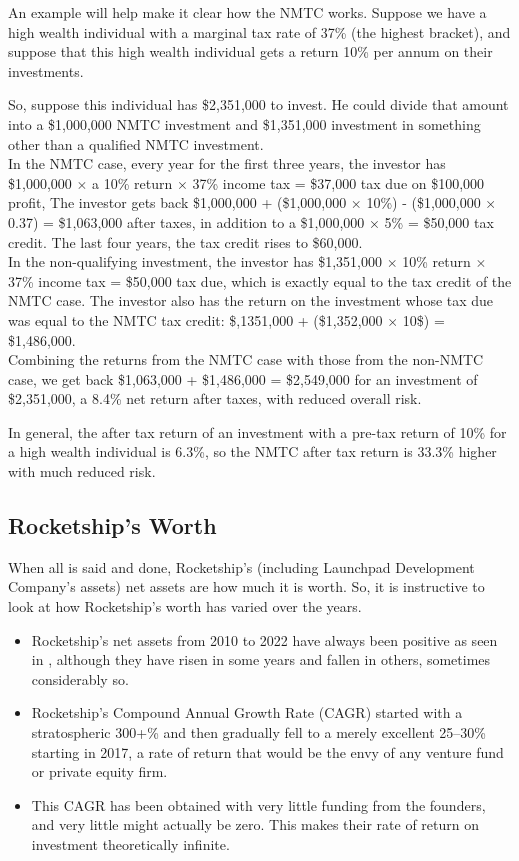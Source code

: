 An example will help make it clear how the NMTC works. Suppose we have a high wealth individual with a marginal tax rate of 37\% (the highest bracket), and suppose that this high wealth individual gets a return 10\% per annum on their investments.

So, suppose this individual has \$2,351,000 to invest. He could divide that amount into a \$1,000,000 NMTC investment and \$1,351,000 investment in something other than a qualified NMTC investment. \\

In the NMTC case, every year for the first three years, the investor has \$1,000,000 $\times$ a 10\% return $\times$ 37\% income tax = \$37,000 tax due on \$100,000 profit, The investor gets back \$1,000,000 + (\$1,000,000 × 10\%) - (\$1,000,000 × 0.37) = \$1,063,000 after taxes, in addition to a \$1,000,000 × 5\% = \$50,000 tax credit. The last four years, the tax credit rises to \$60,000. \\
  
In the non-qualifying investment, the investor has \$1,351,000 $\times$ 10\% return $\times$ 37\% income tax = \$50,000 tax due, which is exactly equal to the tax credit of the NMTC case. The investor also has the return on the investment whose tax due was equal to the NMTC tax credit: \$,1351,000 + (\$1,352,000 $\times$ 10\$) = \$1,486,000.\\

Combining the returns from the NMTC case with those from the non-NMTC case, we get back \$1,063,000 + \$1,486,000 = \$2,549,000 for an investment of \$2,351,000, a 8.4\% net return after taxes, with reduced overall risk.
  
  In general, the after tax return of an investment with a pre-tax return of 10\% for a high wealth individual is 6.3\%, so the NMTC after tax return is 33.3\% higher with much reduced risk.


\subsection{Rocketship's Worth}%
\label{sec:rocketship-worth}\indent%

When all is said and done, Rocketship's (including Launchpad Development Company's assets) net assets are how much it is worth. So, it is instructive to look at how Rocketship's worth has varied over the years.
\begin{itemize}
  \item Rocketship's net assets from 2010 to 2022 have always been positive as seen in , although they have risen in some years and fallen in others, sometimes considerably so.
  \item Rocketship's Compound Annual Growth Rate (CAGR) started with a stratospheric 300+\% and then gradually fell to a merely excellent 25–30\% starting in 2017, a rate of return that would be the envy of any venture fund or private equity firm.
 \item This CAGR has been obtained with very little funding from the founders, and very little might actually be zero. This makes their rate of return on investment theoretically infinite.
\end{itemize}

